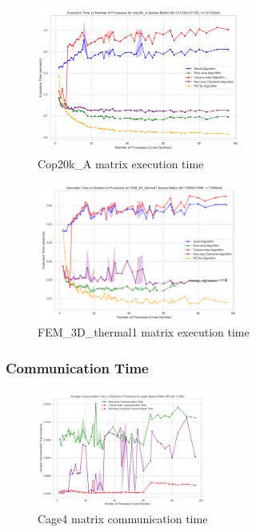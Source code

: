 \documentclass[12pt,oneside]{book} %
\begin{document}
\begin{figure}[H]
    \centering
    \includegraphics[width=0.6\textwidth]{../results/matrix_dim/cop20k_A_k6_execution_time.png}
    \caption{Cop20k\_A matrix execution time}\label{fig:cop20k-a-k6-execution-time}
\end{figure}

\begin{figure}[H]
    \centering
    \includegraphics[width=0.6\textwidth]{../results/matrix_dim/FEM_3D_thermal1_k6_execution_time.png}
    \caption{FEM\_3D\_thermal1 matrix execution time}\label{fig:fem-3d-thermal1-k6-execution-time}
\end{figure}

\subsubsection{Communication Time}

\begin{figure}[H]
    \centering
    \includegraphics[width=0.5\textwidth]{../results/matrix_dim/cage4_k6_communication_time.png}
    \caption{Cage4 matrix communication time}\label{fig:cage4-k6-communication-time}
\end{figure}
\end{document}
